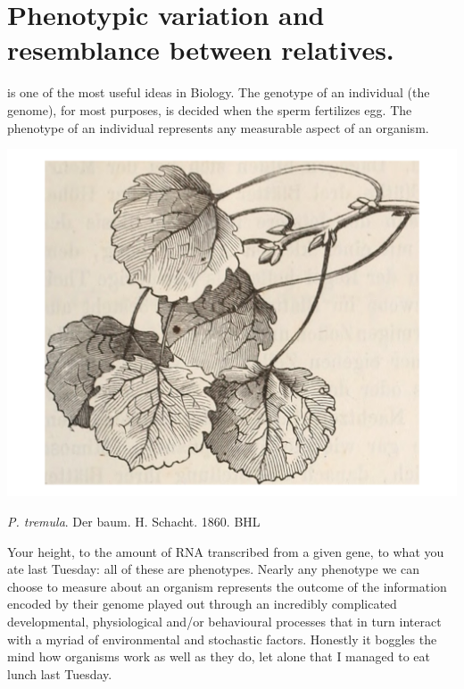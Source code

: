\chapter{Phenotypic variation and resemblance between relatives.}

 is one of the most useful ideas in Biology.\cite{Johannsen:1911} 
The genotype of an individual (the genome), for most purposes, is decided when
the sperm fertilizes egg. The phenotype of an individual represents any
measurable aspect of an organism. \begin{marginfigure}
\begin{center}
\includegraphics[width=0.8 \textwidth]{illustration_images/Quant_gen/Aspen_budset/Aspen_leaves.pdf}
\end{center}
\caption{{\it P. tremula}. Der baum. H. Schacht. 1860. BHL } \label{fig:Apsen_geno_pheno}
\end{marginfigure}   Your height, to the amount of
RNA transcribed from a given gene, to what you ate last Tuesday: all
of these are phenotypes.  Nearly any phenotype we can choose to measure about an organism represents the outcome of the information encoded by their genome played out through an incredibly complicated
developmental, physiological and/or behavioural processes that in turn interact with a myriad of environmental and
stochastic factors. Honestly it boggles the mind how organisms work as well as they do, let alone that I managed to eat lunch last Tuesday. 

